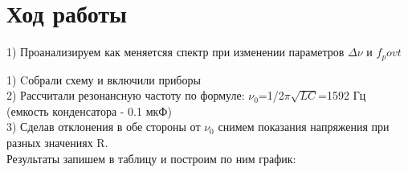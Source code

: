 \documentclass[a4paper,12pt]{article} %
\begin{document}
\section{Ход работы}
1) Проанализируем как меняетсяя спектр при изменении параметров $\Delta$$\nu$ и $f_povt$




















































































1) Cобрали схему и включили приборы\\
2) Рассчитали резонансную частоту по формуле: $\nu_0$=1/2$\pi$$\sqrt{LC}$=1592 Гц  (емкость конденсатора - 0.1 мкФ)\\
3) Сделав отклонения в обе стороны от $\nu_0$ снимем показания напряжения при разных значениях R. \\ 
Результаты запишем в таблицу и построим по ним график:
\end{document}
